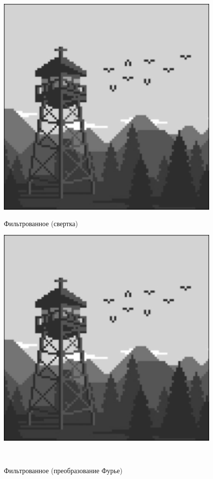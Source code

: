 \documentclass[a4paper]{article}
\begin{document}
\begin{figure}[H]
    \begin{minipage}{0.49\textwidth}
        \centering \includegraphics[width=\textwidth]{2/3_img_block_by_conv2.png}
        \caption{Фильтрованное (свертка)}
    \end{minipage}\hfill
    \begin{minipage}{0.49\textwidth}
        \centering \includegraphics[width=\textwidth]{2/3_img_block_by_fourier.png}
        \caption{Фильтрованное (преобразование Фурье)}
    \end{minipage}\\[1em]
\end{figure}\noindent\
\end{document}
